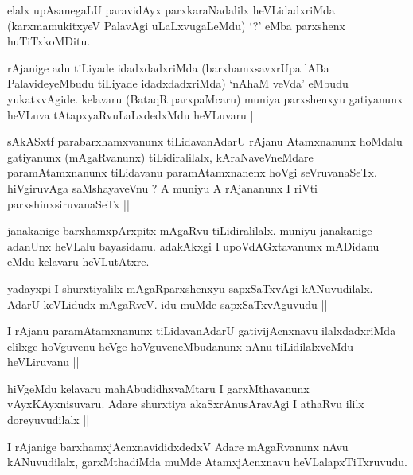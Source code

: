 \begin{artha}
elalx upAsanegaLU paravidAyx parxkaraNadalilx heVLidadxriMda (karxmamukitxyeV PalavAgi uLaLxvugaLeMdu) `\stext ?' eMba parxshenx huTiTxkoMDitu.
\end{artha}


\begin{artha}
rAjanige adu tiLiyade idadxdadxriMda (barxhamxsavxrUpa lABa PalavideyeMbudu tiLiyade idadxdadxriMda) `nAhaM veVda' eMbudu yukatxvAgide. kelavaru (BataqR parxpaMcaru) muniya parxshenxyu gatiyanunx heVLuva tAtapxyaRvuLaLxdedxMdu heVLuvaru ||
\end{artha}


\begin{artha}
sAkASxtf parabarxhamxvanunx tiLidavanAdarU rAjanu Atamxnanunx hoMdalu gatiyanunx (mAgaRvanunx) tiLidiralilalx, kAraNaveVneMdare paramAtamxnanunx tiLidavanu paramAtamxnanenx hoVgi seVruvanaSeTx. hiVgiruvAga saMshayaveVnu ? A muniyu A rAjananunx I riVti parxshinxsiruvanaSeTx ||
\end{artha}


\begin{artha}
janakanige barxhamxpArxpitx mAgaRvu tiLidiralilalx. muniyu janakanige adanUnx heVLalu bayasidanu. adakAkxgi I upoVdAGxtavanunx mADidanu eMdu kelavaru heVLutAtxre.
\end{artha}

\begin{artha}
yadayxpi I shurxtiyalilx mAgaRparxshenxyu sapxSaTxvAgi kANuvudilalx. AdarU keVLidudx mAgaRveV. idu muMde sapxSaTxvAguvudu ||
\end{artha}

\begin{artha}
I rAjanu paramAtamxnanunx tiLidavanAdarU gativijAcnxnavu ilalxdadxriMda elilxge hoVguvenu heVge hoVguveneMbudanunx nAnu tiLidilalxveMdu heVLiruvanu ||
\end{artha}


\begin{artha}
hiVgeMdu kelavaru mahAbudidhxvaMtaru I garxMthavanunx vAyxKAyxnisuvaru. Adare shurxtiya akaSxrAnusAravAgi I athaRvu ililx doreyuvudilalx ||
\end{artha}

\begin{artha}
I rAjanige barxhamxjAcnxnavididxdedxV Adare mAgaRvanunx nAvu kANuvudilalx, garxMthadiMda muMde AtamxjAcnxnavu heVLalapxTiTxruvudu. 
\end{artha}

